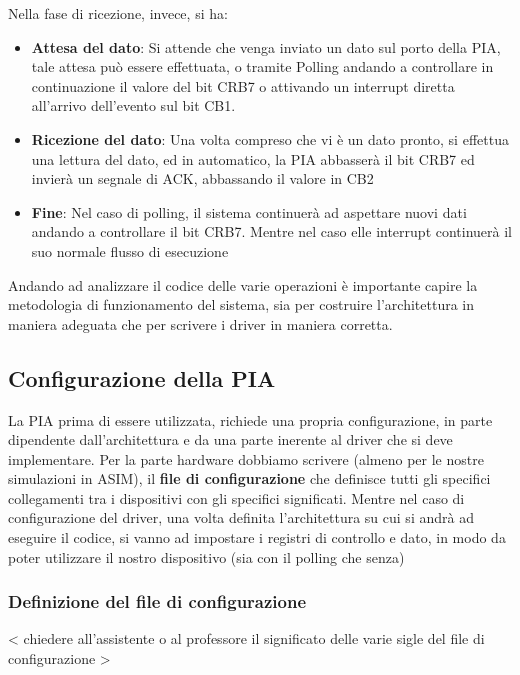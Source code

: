 Nella fase di ricezione, invece, si ha:
\begin{itemize}
    \item \textbf{Attesa del dato}: Si attende che venga inviato un dato sul porto della PIA, tale attesa può essere effettuata, o tramite Polling andando a controllare in continuazione il valore del bit CRB7 o attivando un interrupt diretta all'arrivo dell'evento sul bit CB1.
    
    \item \textbf{Ricezione del dato}: Una volta compreso che vi è un dato pronto, si effettua una lettura del dato, ed in automatico, la PIA abbasserà il bit CRB7 ed invierà un segnale di ACK, abbassando il valore in CB2

    \item \textbf{Fine}: Nel caso di polling, il sistema continuerà ad aspettare nuovi dati andando a controllare il bit CRB7. Mentre nel caso elle interrupt continuerà il suo normale flusso di esecuzione
\end{itemize}

Andando ad analizzare il codice delle varie operazioni è importante capire la metodologia di funzionamento del sistema, sia per costruire l'architettura in maniera adeguata che per scrivere i driver in maniera corretta.

\subsection{Configurazione della PIA}
La PIA prima di essere utilizzata, richiede una propria configurazione, in parte dipendente dall'architettura e da una parte inerente al driver che si deve implementare.
Per la parte hardware dobbiamo scrivere (almeno per le nostre simulazioni in ASIM), il \textbf{file di configurazione} che definisce tutti gli specifici collegamenti tra i dispositivi con gli specifici significati. Mentre nel caso di configurazione del driver, una volta definita l'architettura su cui si andrà ad eseguire il codice, si vanno ad impostare i registri di controllo e dato, in modo da poter utilizzare il nostro dispositivo (sia con il polling che senza)

\subsubsection{Definizione del file di configurazione}
< chiedere all'assistente o al professore il significato delle varie sigle del file di configurazione >

